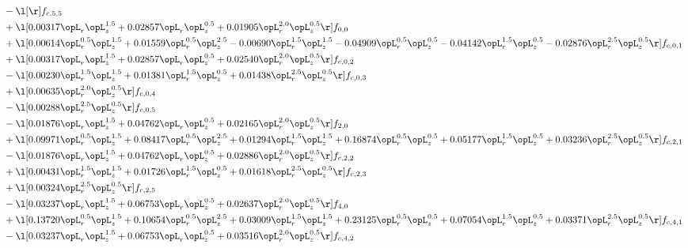 \begin{alignat}{2}
& - \l[  \r] f_{c,5,5} \nonumber \\ 
& + \l[  0.00317 \opL_r \opL_z^{1.5} +  0.02857 \opL_r \opL_z^{0.5} +  0.01905 \opL_r^{2.0} \opL_z^{0.5}  \r] f_{0,0} \nonumber \\ 
& + \l[  0.00614 \opL_r^{0.5} \opL_z^{1.5} +  0.01559 \opL_r^{0.5} \opL_z^{2.5}   -0.00690 \opL_r^{1.5} \opL_z^{1.5}   -0.04909 \opL_r^{0.5} \opL_z^{0.5}   -0.04142 \opL_r^{1.5} \opL_z^{0.5}   -0.02876 \opL_r^{2.5} \opL_z^{0.5}  \r] f_{c,0,1} \nonumber \\ 
& + \l[  0.00317 \opL_r \opL_z^{1.5} +  0.02857 \opL_r \opL_z^{0.5} +  0.02540 \opL_r^{2.0} \opL_z^{0.5}  \r] f_{c,0,2} \nonumber \\ 
& - \l[  0.00230 \opL_r^{1.5} \opL_z^{1.5} +  0.01381 \opL_r^{1.5} \opL_z^{0.5} +  0.01438 \opL_r^{2.5} \opL_z^{0.5}  \r] f_{c,0,3} \nonumber \\ 
& + \l[  0.00635 \opL_r^{2.0} \opL_z^{0.5}  \r] f_{c,0,4} \nonumber \\ 
& - \l[  0.00288 \opL_r^{2.5} \opL_z^{0.5}  \r] f_{c,0,5} \nonumber \\ 
& - \l[  0.01876 \opL_r \opL_z^{1.5} +  0.04762 \opL_r \opL_z^{0.5} +  0.02165 \opL_r^{2.0} \opL_z^{0.5}  \r] f_{2,0} \nonumber \\ 
& + \l[  0.09971 \opL_r^{0.5} \opL_z^{1.5} +  0.08417 \opL_r^{0.5} \opL_z^{2.5} +  0.01294 \opL_r^{1.5} \opL_z^{1.5} +  0.16874 \opL_r^{0.5} \opL_z^{0.5} +  0.05177 \opL_r^{1.5} \opL_z^{0.5} +  0.03236 \opL_r^{2.5} \opL_z^{0.5}  \r] f_{c,2,1} \nonumber \\ 
& - \l[  0.01876 \opL_r \opL_z^{1.5} +  0.04762 \opL_r \opL_z^{0.5} +  0.02886 \opL_r^{2.0} \opL_z^{0.5}  \r] f_{c,2,2} \nonumber \\ 
& + \l[  0.00431 \opL_r^{1.5} \opL_z^{1.5} +  0.01726 \opL_r^{1.5} \opL_z^{0.5} +  0.01618 \opL_r^{2.5} \opL_z^{0.5}  \r] f_{c,2,3} \nonumber \\ 
& + \l[  0.00324 \opL_r^{2.5} \opL_z^{0.5}  \r] f_{c,2,5} \nonumber \\ 
& - \l[  0.03237 \opL_r \opL_z^{1.5} +  0.06753 \opL_r \opL_z^{0.5} +  0.02637 \opL_r^{2.0} \opL_z^{0.5}  \r] f_{4,0} \nonumber \\ 
& + \l[  0.13720 \opL_r^{0.5} \opL_z^{1.5} +  0.10654 \opL_r^{0.5} \opL_z^{2.5} +  0.03009 \opL_r^{1.5} \opL_z^{1.5} +  0.23125 \opL_r^{0.5} \opL_z^{0.5} +  0.07054 \opL_r^{1.5} \opL_z^{0.5} +  0.03371 \opL_r^{2.5} \opL_z^{0.5}  \r] f_{c,4,1} \nonumber \\ 
& - \l[  0.03237 \opL_r \opL_z^{1.5} +  0.06753 \opL_r \opL_z^{0.5} +  0.03516 \opL_r^{2.0} \opL_z^{0.5}  \r] f_{c,4,2} \nonumber \\ 

\end{alignat}
